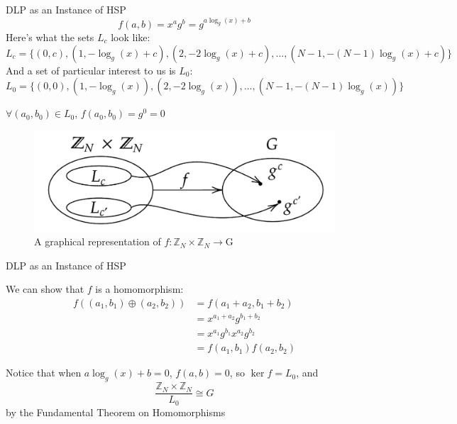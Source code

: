 \documentclass{beamer}
\begin{document}
\begin{frame}{DLP as an Instance of HSP}
    \[
        f(a,b) = x^a g^b = g^{a \log_g(x) + b}
    \]
    Here's what the sets $L_c$ look like:
    \[
        \scriptstyle L_c = \{(0, c), (1, -\log_g(x)+c), (2, -2\log_g(x)+c),... , (N - 1, -(N  - 1)\log_g(x)+c)\}
    \]
    And a set of particular interest to us is $L_0$:
    \[
        \scriptstyle L_0 = \{(0, 0), (1, -\log_g(x)), (2, -2\log_g(x)),... , (N - 1, -(N  - 1)\log_g(x))\}
    \]

    $\forall (a_0, b_0) \in L_0$, $f(a_0, b_0) = g^0 = 0$
    \begin{figure}
    \centering
    \includegraphics[width=0.6\linewidth]{figures/function diagram.png}
    \caption{A graphical representation of $f:\mathbb{Z}_N \times \mathbb{Z}_N \rightarrow \mathrm{G}$}
    \label{fig:enter-label}
\end{figure}
\end{frame}

\begin{frame}{DLP as an Instance of HSP}

    We can show that $f$ is a homomorphism:
    \[
    \begin{split}
        f((a_1, b_1)\oplus (a_2, b_2)) & = f(a_1+a_2, b_1+b_2) \\
         & = x^{a_1+a_2} g ^{b_1+b_2} \\
         & = x^{a_1} g^{b_1} x^{a_2} g^{b_2} \\
         & = f(a_1, b_1)f(a_2, b_2)
    \end{split}
    \]
    
    Notice that when $a \log_g(x) + b = 0$, $f(a,b) = 0$, so $\ker f = L_0$, and \[\frac{\mathbb{Z}_N \times \mathbb{Z}_N}{L_0} \cong G\] by the Fundamental Theorem on Homomorphisms
    
\end{frame}
\end{document}
